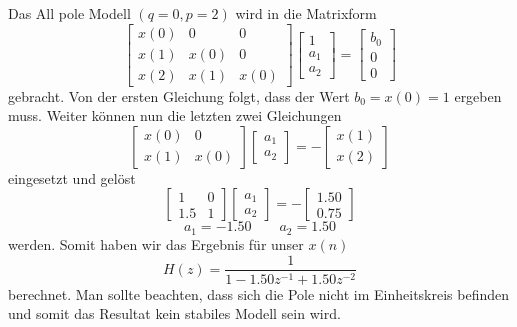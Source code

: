 Das All pole Modell $(q=0,p=2)$ wird in die Matrixform
\begin{equation}\left[\begin{array}{ccc}
x(0) & 0 & 0 \\
x(1) & x(0) & 0 \\
x(2) & x(1) & x(0)
\end{array}\right]\left[\begin{array}{c}
1 \\
a_1 \\
a_2
\end{array}\right]=\left[\begin{array}{c}
b_0 \\
0 \\
0
\end{array}\right]\end{equation}
gebracht. 
Von der ersten Gleichung folgt, dass der Wert $b_0 = x(0)=1$ ergeben muss. 
Weiter können nun die letzten zwei Gleichungen
\begin{equation}\left[\begin{array}{ll}
x(0) & 0 \\
x(1) & x(0)
\end{array}\right]\left[\begin{array}{l}
a_1 \\
a_2
\end{array}\right]=-\left[\begin{array}{l}
x(1) \\
x(2)
\end{array}\right]\end{equation}
eingesetzt und gelöst
\begin{equation}\left[\begin{array}{cc}
1 & 0 \\
1.5 & 1
\end{array}\right]\left[\begin{array}{l}
a_1 \\
a_2
\end{array}\right]=-\left[\begin{array}{c}
1.50 \\
0.75
\end{array}\right]\end{equation}
\begin{equation}
a_1=-1.50 \quad  \quad a_2=1.50
\end{equation}
werden.
Somit haben wir das Ergebnis für unser $x(n)$
\begin{equation}
H(z)=\frac{1}{1-1.50 z^{-1}+1.50 z^{-2}}
\end{equation}
berechnet.
Man sollte beachten, dass sich die Pole nicht im Einheitskreis befinden und somit das Resultat kein stabiles Modell sein wird.

